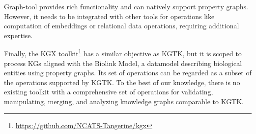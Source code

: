 \documentclass[runningheads]{llncs}
\newcommand{\kibitz}[2]{%
{\color{#1}#2}{}%
}
\newcommand{\filip}[1]{\kibitz{purple}{[FI:#1]}} %
\newcommand{\DS}[1]{\kibitz{blue}{[DS: #1]}} %
\newcommand{\DG}[1]{\kibitz{red}{[DG: #1]}} %
\begin{document}
Graph-tool provides rich functionality and can natively support property graphs. However, it needs to be integrated with other tools for operations like computation of embeddings or relational data operations, requiring additional expertise. 

Finally, the KGX toolkit\footnote{\url{https://github.com/NCATS-Tangerine/kgx}} has a similar objective as KGTK, but it is scoped to process KGs aligned with the Biolink Model, a datamodel describing biological entities using property graphs. Its set of operations can be regarded as a subset of the operations supported by KGTK. To the best of our knowledge, there is no existing toolkit with a comprehensive set of operations for validating, manipulating, merging, and analyzing knowledge graphs comparable to KGTK. 






\end{document}
